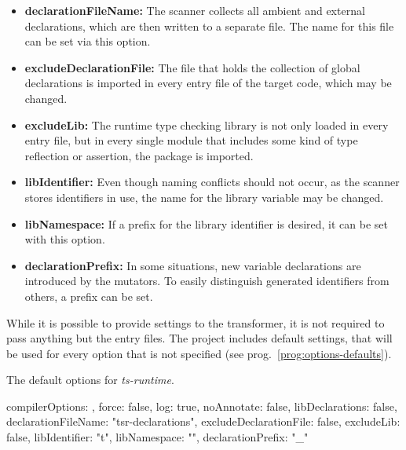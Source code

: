 \begin{itemize}
  \item \textbf{declarationFileName:} The scanner collects all ambient and external declarations, which are then written to a separate file. The name for this file can be set via this option.
  \item \textbf{excludeDeclarationFile:} The file that holds the collection of global declarations is imported in every entry file of the target code, which may be changed.
  \item \textbf{excludeLib:} The runtime type checking library is not only loaded in every entry file, but in every single module that includes some kind of type reflection or assertion, the package is imported.
  \item \textbf{libIdentifier:} Even though naming conflicts should not occur, as the scanner stores identifiers in use, the name for the library variable may be changed.
  \item \textbf{libNamespace:} If a prefix for the library identifier is desired, it can be set with this option.
  \item \textbf{declarationPrefix:} In some situations, new variable declarations are introduced by the mutators. To easily distinguish generated identifiers from others, a prefix can be set.
\end{itemize}
While it is possible to provide settings to the transformer, it is not required to pass anything but the entry files. The project includes default settings, that will be used for every option that is not specified (see prog.~\ref{prog:options-defaults}).
\begin{program}
\caption{The default options for \emph{ts-runtime}.}
\label{prog:options-defaults}
\begin{JsCode}
{
  compilerOptions: {},
  force: false,
  log: true,
  noAnnotate: false,
  libDeclarations: false,
  declarationFileName: "tsr-declarations",
  excludeDeclarationFile: false,
  excludeLib: false,
  libIdentifier: "t",
  libNamespace: "",
  declarationPrefix: "_"
}
\end{JsCode}
\end{program}

